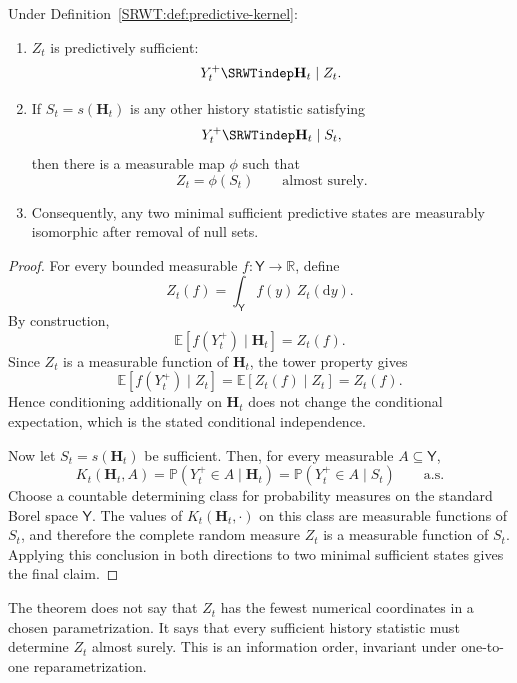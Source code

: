 \begin{SRWTtheorem}
\label{SRWT:thm:predictive-state}
Under Definition~\ref{SRWT:def:predictive-kernel}:
\begin{enumerate}
\item \(Z_t\) is predictively sufficient:
\[
Y_t^+\SRWTindep\mathbf H_t\mid Z_t.
\]
\item If \(S_t=s(\mathbf H_t)\) is any other history statistic satisfying
\[
Y_t^+\SRWTindep\mathbf H_t\mid S_t,
\]
then there is a measurable map \(\phi\) such that
\[
Z_t=\phi(S_t)
\qquad\text{almost surely}.
\]
\item Consequently, any two minimal sufficient predictive states are
measurably isomorphic after removal of null sets.
\end{enumerate}
\end{SRWTtheorem}

\begin{proof}
For every bounded measurable \(f:\mathsf Y\to\mathbb R\), define
\[
Z_t(f)=\int_{\mathsf Y}f(y)\,Z_t(\mathrm dy).
\]
By construction,
\[
\mathbb E[f(Y_t^+)\mid\mathbf H_t]=Z_t(f).
\]
Since \(Z_t\) is a measurable function of \(\mathbf H_t\), the tower property
gives
\[
\mathbb E[f(Y_t^+)\mid Z_t]
=
\mathbb E[Z_t(f)\mid Z_t]
=
Z_t(f).
\]
Hence conditioning additionally on \(\mathbf H_t\) does not change the
conditional expectation, which is the stated conditional independence.

Now let \(S_t=s(\mathbf H_t)\) be sufficient. Then, for every measurable
\(A\subseteq\mathsf Y\),
\[
K_t(\mathbf H_t,A)
=
\mathbb P(Y_t^+\in A\mid\mathbf H_t)
=
\mathbb P(Y_t^+\in A\mid S_t)
\qquad\text{a.s.}
\]
Choose a countable determining class for probability measures on the standard
Borel space \(\mathsf Y\). The values of \(K_t(\mathbf H_t,\cdot)\) on this
class are measurable functions of \(S_t\), and therefore the complete random
measure \(Z_t\) is a measurable function of \(S_t\). Applying this conclusion
in both directions to two minimal sufficient states gives the final claim.
\end{proof}

\begin{SRWTremark}
The theorem does not say that \(Z_t\) has the fewest numerical coordinates in
a chosen parametrization. It says that every sufficient history statistic
must determine \(Z_t\) almost surely. This is an information order, invariant
under one-to-one reparametrization.
\end{SRWTremark}

